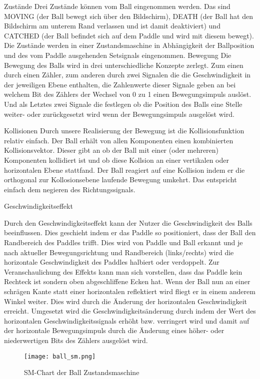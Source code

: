 \documentclass{scrartcl}
\begin{document}
Zustände
Drei Zustände können vom Ball eingenommen werden.
Das sind MOVING (der Ball bewegt sich über den Bildschirm), DEATH (der Ball hat den Bildschirm am unterem Rand verlassen und ist damit deaktiviert) und CATCHED (der Ball befindet sich auf dem Paddle und wird mit diesem bewegt).
Die Zustände werden in einer Zustandsmaschine in Abhängigkeit der Ballposition und des vom Paddle ausgehenden Setsignals eingenommen.
Bewegung
Die Bewegung des Balls wird in drei unterschiedliche Konzepte zerlegt.
Zum einen durch einen Zähler, zum anderen durch zwei Signalen die die Geschwindigkeit in der jeweiligen Ebene enthalten, die Zahlenwerte dieser Signale geben an bei welchem Bit des Zählers der Wechsel von 0 zu 1 einen Bewegungsimpuls auslöst.
Und als Letztes zwei Signale die festlegen ob die Position des Balls eine Stelle weiter- oder zurückgesetzt wird wenn der Bewegungsimpuls ausgelöst wird.


Kollisionen
Durch unsere Realisierung der Bewegung ist die Kollisionsfunktion relativ einfach.
Der Ball erhält von allen Komponenten einen kombinierten Kollisionsvektor.
Dieser gibt an ob der Ball mit einer (oder mehreren) Komponenten kollidiert ist und ob diese Kollsion an einer vertikalen oder horizontalen Ebene stattfand.
Der Ball reagiert auf eine Kollision indem er die orthogonal zur Kollosionsebene laufende Bewegung umkehrt.
Das entspricht einfach dem negieren des Richtungssignals.

Geschwindigkeitseffekt

Durch den Geschwindigkeitseffekt kann der Nutzer die Geschwindigkeit des Balls beeinflussen.
Dies geschieht indem er das Paddle so positioniert, dass der Ball den Randbereich des Paddles trifft.
Dies wird von Paddle und Ball erkannt und je nach aktueller Bewegungsrichtung und Randbereich (links/rechts) wird die horizontale Geschwindigkeit des Paddles halbiert oder verdoppelt.
Zur Veranschaulichung des Effekts kann man sich vorstellen, dass das Paddle kein Rechteck ist sondern oben abgeschliffene Ecken hat.
Wenn der Ball nun an einer schrägen Kante statt einer horizontalen reflektiert wird fliegt er in einem anderem Winkel weiter.
Dies wird durch die Änderung der horizontalen Geschwindigkeit erreicht.
Umgesetzt wird die Geschwindigkeitsänderung durch indem der Wert des horizontalen Geschwindigkeitssignals erhöht bzw. verringert wird und damit auf der horizontale Bewegungsimpuls durch die Änderung eines höher- oder niederwertigen Bits des Zählers ausgelöst wird.

\begin{figure}[h!]
	\centering
	\texttt{[image: ball\_sm.png]}
	\caption{SM-Chart der Ball Zustandsmaschine}
\end{figure}
\end{document}
